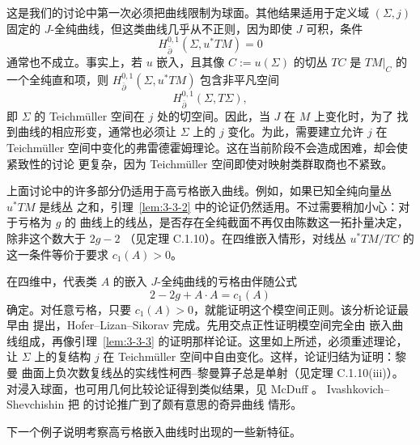 这是我们的讨论中第一次必须把曲线限制为球面。其他结果适用于定义域 $(\Sigma,j)$ 固定的
$J$-全纯曲线，但这类曲线几乎从不正则，因为即使 $J$ 可积，条件
\[
  H_{\bar\partial}^{0,1}(\Sigma,u^*TM)=0
\]
通常也不成立。事实上，若 $u$ 嵌入，且其像 $C:=u(\Sigma)$ 的切丛 $TC$ 是
$\left.TM\right|_C$ 的一个全纯直和项，则 $H_{\bar\partial}^{0,1}(\Sigma,u^*TM)$
包含非平凡空间
\[
  H_{\bar\partial}^{0,1}(\Sigma,T\Sigma),
\]
即 $\Sigma$ 的 Teichmüller 空间在 $j$ 处的切空间。因此，当 $J$ 在 $M$ 上变化时，为了
找到曲线的相应形变，通常也必须让 $\Sigma$ 上的 $j$ 变化。为此，需要建立允许 $j$ 在
Teichmüller 空间中变化的弗雷德霍姆理论。这在当前阶段不会造成困难，却会使紧致性的讨论
更复杂，因为 Teichmüller 空间即使对映射类群取商也不紧致。

上面讨论中的许多部分仍适用于高亏格嵌入曲线。例如，如果已知全纯向量丛 $u^*TM$ 是线丛
之和，引理~\ref{lem:3-3-2} 中的论证仍然适用。不过需要稍加小心：对于亏格为 $g$ 的
曲线上的线丛，是否存在全纯截面不再仅由陈数这一拓扑量决定，除非这个数大于 $2g-2$
（见定理 C.1.10）。在四维嵌入情形，对线丛 $u^*TM/TC$ 的这一条件等价于要求
$c_1(A)>0$。

在四维中，代表类 $A$ 的嵌入 $J$-全纯曲线的亏格由伴随公式
\[
  2-2g+A\cdot A=c_1(A)
\]
确定。对任意亏格，只要 $c_1(A)>0$，就能证明这个模空间正则。该分析论证最早由
提出，Hofer--Lizan--Sikorav 
完成。先用交点正性证明模空间完全由
嵌入曲线组成，再像引理~\ref{lem:3-3-3} 的证明那样论证。这里如上所述，必须重述理论，
让 $\Sigma$ 上的复结构 $j$ 在 Teichmüller 空间中自由变化。这样，论证归结为证明：黎曼
曲面上负次数复线丛的实线性柯西--黎曼算子总是单射（见定理 C.1.10\textup{(iii)}）。
对浸入球面，也可用几何比较论证得到类似结果，见 McDuff 。
Ivashkovich--Shevchishin  把  的讨论推广到了颇有意思的奇异曲线
情形。

下一个例子说明考察高亏格嵌入曲线时出现的一些新特征。

